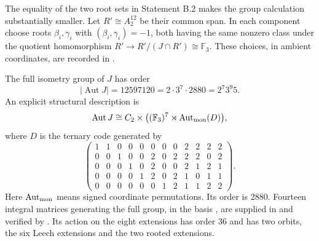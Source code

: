 The equality of the two root sets in Statement B.2 makes the group
calculation substantially smaller. Let \(R'\cong A_2^{12}\) be their
common span. In each component choose roots \(\beta_i,\gamma_i\)
with \((\beta_i,\gamma_i)=-1\), both having the same nonzero class
under the quotient homomorphism \(R'\to R'/(J\cap R')\cong\mathbb F_3\).
These choices, in ambient coordinates, are recorded in
.

\begin{statement}
The full isometry group of \(J\) has order
\[
 |\operatorname{Aut}J|=12597120=2\cdot3^7\cdot2880
                      =2^7 3^9 5.
\]
An explicit structural description is
\[
 \operatorname{Aut}J\cong C_2\times
    \bigl((\mathbb F_3)^7\rtimes\operatorname{Aut}_{\rm mon}(D)\bigr),
\]
where \(D\) is the ternary code generated by
\begin{equation}\label{eq:B-code}
\begin{pmatrix}
1&1&0&0&0&0&0&0&2&2&2&2\\
0&0&1&0&0&2&0&2&2&2&0&2\\
0&0&0&1&0&2&0&0&2&1&2&1\\
0&0&0&0&1&2&0&2&1&0&1&1\\
0&0&0&0&0&0&1&2&1&1&2&2
\end{pmatrix}.
\end{equation}
Here \(\operatorname{Aut}_{\rm mon}\) means signed coordinate
permutations. Its order is 2880. Fourteen integral matrices generating
the full group, in the basis , are supplied in
 and verified by .
Its action on the eight extensions has order 36 and has two orbits,
the six Leech extensions and the two rooted extensions.
\end{statement}

